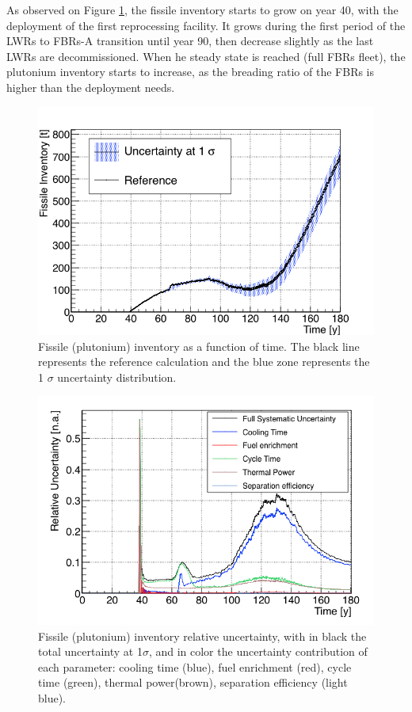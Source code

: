 \documentclass{anstrans}
\begin{document}
As observed on Figure \ref{fig:pu_full}, the fissile inventory starts to grow on
year 40, with the deployment of the first reprocessing facility.  It grows
during the first period of the \glspl{LWR} to \glspl{FBR}-A transition until
year 90, then decrease slightly as the last \glspl{LWR} are decommissioned.
When he steady state is reached (full \glspl{FBR} fleet), the plutonium
inventory starts to increase, as the breading ratio of the \glspl{FBR} is higher
than the deployment needs.

\begin{figure}[ht] %
    \centering
    \includegraphics[scale=0.35]{pu_full}
    \caption{Fissile (plutonium) inventory as a function of time.  The black line
        represents the reference calculation and the blue zone
        represents the 1 $\sigma$ uncertainty distribution.}\label{fig:pu_full}
\end{figure}

\begin{figure}[h!!] %
    \centering
    \includegraphics[scale=0.35]{pu_uncer}
    \caption{Fissile (plutonium) inventory relative uncertainty, with
    in black the total uncertainty at 1$\sigma$, and in color the uncertainty
    contribution of each parameter: cooling time (blue), fuel enrichment (red),
    cycle time (green), thermal power(brown), separation efficiency (light
    blue).}\label{fig:pu_uncer}
\end{figure}
\end{document}
